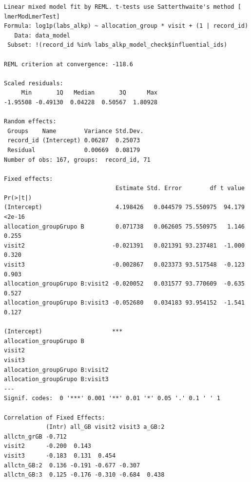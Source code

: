 \documentclass[
  letterpaper,
  DIV=11,
  numbers=noendperiod]{scrartcl}
\newenvironment{Shaded}{\begin{snugshade}}{\end{snugshade}}
\newcommand{\NormalTok}[1]{\textcolor[rgb]{0.00,0.23,0.31}{#1}}
\newcommand{\SpecialCharTok}[1]{\textcolor[rgb]{0.37,0.37,0.37}{#1}}
\begin{document}
\begin{verbatim}
Linear mixed model fit by REML. t-tests use Satterthwaite's method [
lmerModLmerTest]
Formula: log1p(labs_alkp) ~ allocation_group * visit + (1 | record_id)
   Data: data_model
 Subset: !(record_id %in% labs_alkp_model_check$influential_ids)

REML criterion at convergence: -118.6

Scaled residuals: 
     Min       1Q   Median       3Q      Max 
-1.95508 -0.49130  0.04228  0.50567  1.80928 

Random effects:
 Groups    Name        Variance Std.Dev.
 record_id (Intercept) 0.06287  0.25073 
 Residual              0.00669  0.08179 
Number of obs: 167, groups:  record_id, 71

Fixed effects:
                                Estimate Std. Error        df t value Pr(>|t|)
(Intercept)                     4.198426   0.044579 75.550975  94.179   <2e-16
allocation_groupGrupo B         0.071738   0.062605 75.550975   1.146    0.255
visit2                         -0.021391   0.021391 93.237481  -1.000    0.320
visit3                         -0.002867   0.023373 93.517548  -0.123    0.903
allocation_groupGrupo B:visit2 -0.020052   0.031577 93.770609  -0.635    0.527
allocation_groupGrupo B:visit3 -0.052680   0.034183 93.954152  -1.541    0.127
                                  
(Intercept)                    ***
allocation_groupGrupo B           
visit2                            
visit3                            
allocation_groupGrupo B:visit2    
allocation_groupGrupo B:visit3    
---
Signif. codes:  0 '***' 0.001 '**' 0.01 '*' 0.05 '.' 0.1 ' ' 1

Correlation of Fixed Effects:
            (Intr) all_GB visit2 visit3 a_GB:2
allctn_grGB -0.712                            
visit2      -0.200  0.143                     
visit3      -0.183  0.131  0.454              
allctn_GB:2  0.136 -0.191 -0.677 -0.307       
allctn_GB:3  0.125 -0.176 -0.310 -0.684  0.438
\end{verbatim}

\begin{Shaded}
\end{Shaded}
\end{document}
